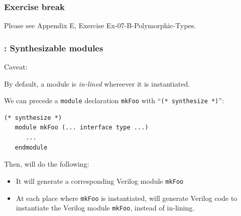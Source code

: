 \begin{frame}
\frametitle{\EmojiExercise \hmm Exercise break}

Please see Appendix E, Exercise Ex-07-B-Polymorphic-Types.

\end{frame}


\begin{frame}[fragile]
\frametitle{{\BSV}: Synthesizable modules}

\footnotesize

Caveat:

\vspace{5ex}

By default, a {\BSV} module is \emph{in-lined} whereever it is instantiated.

\vspace{1ex}

We can precede a {\tt module} declaration {\tt mkFoo} with ``{\tt (*
synthesize *)}'':

\begin{Verbatim}[frame=single]
   (* synthesize *)
   module mkFoo (... interface type ...)
      ...
   endmodule
\end{Verbatim}

Then, {\bsc} will do the following:
\begin{itemize}
 \item It will generate a corresponding  Verilog module {\tt mkFoo}

 \item At each place where {\tt mkFoo} is instantiated, {\bsc} will
       generate Verilog code to instantiate the Verilog module {\tt mkFoo},
       instead of in-lining.
\end{itemize}

\end{frame}


